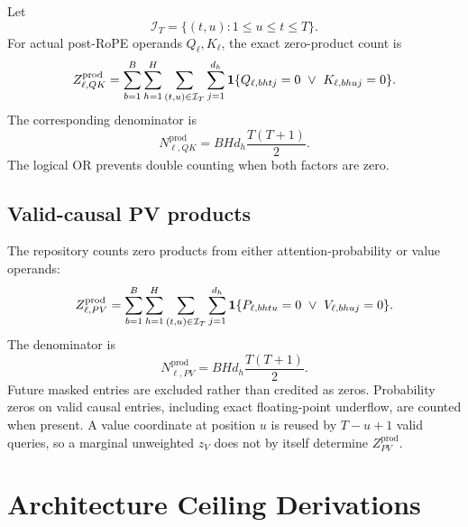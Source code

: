 Let
\begin{equation}
    \mathcal I_T=\{(t,u):1\le u\le t\le T\}.
    \label{eq:causal-index-set}
\end{equation}
For actual post-RoPE operands $Q_\ell,K_\ell$, the exact zero-product count is
\begin{equation}
\begin{aligned}
    Z^{\mathrm{prod}}_{\ell,QK}
      =\sum_{b=1}^{B}\sum_{h=1}^{H}
       \sum_{(t,u)\in\mathcal I_T}\sum_{j=1}^{d_h}
       \mathbf{1}\{Q_{\ell,bhtj}=0\ \lor\ K_{\ell,bhuj}=0\}.
\end{aligned}
    \label{eq:qk-zero-products}
\end{equation}
The corresponding denominator is
\begin{equation}
    N^{\mathrm{prod}}_{\ell,QK}
      =BHd_h\frac{T(T+1)}{2}.
    \label{eq:qk-total-products}
\end{equation}
The logical OR prevents double counting when both factors are zero.

\subsection{Valid-causal PV products}

The repository counts zero products from either attention-probability or value
operands:
\begin{equation}
\begin{aligned}
    Z^{\mathrm{prod}}_{\ell,PV}
      =\sum_{b=1}^{B}\sum_{h=1}^{H}
       \sum_{(t,u)\in\mathcal I_T}\sum_{j=1}^{d_h}
       \mathbf{1}\{P_{\ell,bhtu}=0\ \lor\ V_{\ell,bhuj}=0\}.
\end{aligned}
    \label{eq:pv-zero-products}
\end{equation}
The denominator is
\begin{equation}
    N^{\mathrm{prod}}_{\ell,PV}
      =BHd_h\frac{T(T+1)}{2}.
    \label{eq:pv-total-products}
\end{equation}
Future masked entries are excluded rather than credited as zeros. Probability
zeros on valid causal entries, including exact floating-point underflow, are
counted when present. A value coordinate at position $u$ is reused by
$T-u+1$ valid queries, so a marginal unweighted $z_V$ does not by itself
determine $Z^{\mathrm{prod}}_{PV}$.

\section{Architecture Ceiling Derivations}
\label{app:ceiling-derivations}


